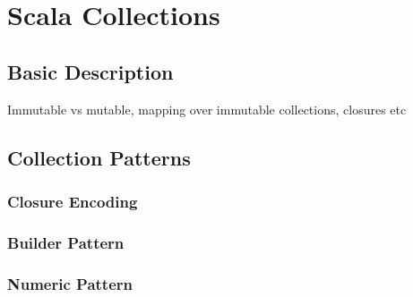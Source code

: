 \section{Scala Collections}

\subsection{Basic Description}

Immutable vs mutable, mapping over immutable collections, closures etc

\subsection{Collection Patterns}

\subsubsection{Closure Encoding}
\subsubsection{Builder Pattern}
\subsubsection{Numeric Pattern}